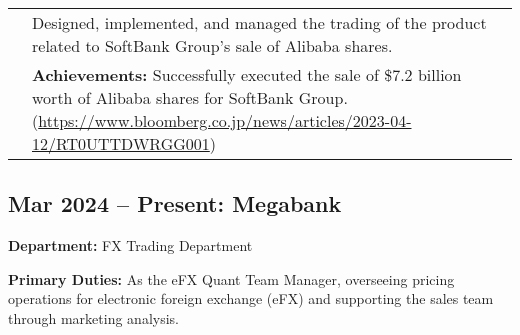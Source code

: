 \documentclass[uplatex,a4j,10.5pt,dvipdfmx]{jsarticle}
\newcommand{\textbfsubsection}[1]{\subsection*{\textbf{#1}}}
\begin{document}
\begin{longtable}{|c|p{14cm}|}
	                                      & Designed, implemented, and managed the trading of the product related to SoftBank Group's sale of Alibaba shares.                                                                                                                                                                                                                            \\
	                                      & {\small \textbf{Achievements:}} Successfully executed the sale of \$7.2 billion worth of Alibaba shares for SoftBank Group. (\url{https://www.bloomberg.co.jp/news/articles/2023-04-12/RT0UTTDWRGG001})                                                                                                                                      \\
	\hline
\end{longtable}

\textbfsubsection{Mar 2024 -- Present: Megabank}

\noindent\textbf{Department:} FX Trading Department

\noindent\textbf{Primary Duties:} As the eFX Quant Team Manager, overseeing pricing operations for electronic foreign exchange (eFX) and supporting the sales team through marketing analysis.
\end{document}
